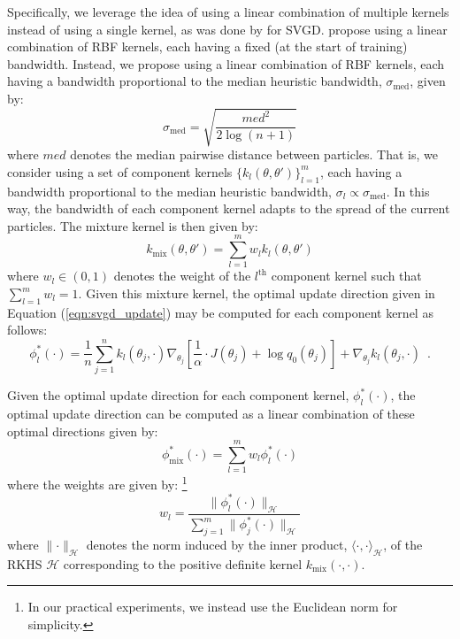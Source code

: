 Specifically, we leverage the idea of using a linear combination of multiple kernels  instead of using a single kernel, as was done by \citet{ai_mk_svgd} for SVGD. \citet{ai_mk_svgd} propose using a linear combination of RBF kernels, each having a fixed (at the start of training) bandwidth. Instead, we propose using a linear combination of RBF kernels, each having a bandwidth proportional to the median heuristic bandwidth, $\sigma_{\mathrm{med}}$, given by:
\renewcommand{\theequation}{4.10}
\begin{equation} 
\label{eqn:median_heuristic}
\sigma_{\mathrm{med}} = \sqrt{\frac{med^2}{2 \log(n+1)}}
\end{equation}
where $med$ denotes the median pairwise distance between particles. That is, we consider using a set of component kernels $\{k_l(\theta, \theta')\}_{l=1}^m$, each having a bandwidth proportional to the median heuristic bandwidth, $\sigma_l \propto \sigma_{\mathrm{med}}$. In this way, the bandwidth of each component kernel adapts to the spread of the current particles. The mixture kernel is then given by:
\renewcommand{\theequation}{4.11}
\begin{equation}
k_{\mathrm{mix}}(\theta, \theta') = \sum_{l=1}^m w_l k_l(\theta, \theta')
\end{equation}
where $w_l \in (0, 1)$ denotes the weight of the $l^\text{th}$ component kernel such that $\sum_{l=1}^m w_l = 1$. 
Given this mixture kernel, the optimal update direction given in Equation (\ref{eqn:svgd_update}) may be computed for each component kernel as follows:
\renewcommand{\theequation}{4.12}
\begin{equation}
\label{eqn:4_12}
\phi_l^*(\cdot) = \frac{1}{n}\sum_{j=1}^n k_l(\theta_j, \cdot) \nabla_{\theta_j}\left[\frac{1}{\alpha} \cdot J(\theta_j) + \log q_0(\theta_j) \right] + \nabla_{\theta_j}k_l(\theta_j, \cdot) \enspace.
\end{equation}

Given the optimal update direction for each component kernel, $\phi^*_l(\cdot)$, the optimal update direction can be computed as a linear combination of these optimal directions given by:
\renewcommand{\theequation}{4.13}
\begin{equation}
\label{eqn:4_13}
\phi_{\mathrm{mix}}^*(\cdot) = \sum_{l=1}^m w_l \phi^*_l(\cdot)
\end{equation}
where the weights are given by: \footnote{In our practical experiments, we instead use the Euclidean norm for simplicity.}
\renewcommand{\theequation}{4.14}
\begin{equation}
\label{eqn:4_14}
w_l= \frac{\lVert \phi_l^*(\cdot) \rVert_{\mathcal{H}}}{\sum_{j=1}^m \lVert \phi_j^*(\cdot) \rVert_{\mathcal{H}}}
\end{equation}
where $\lVert \cdot \rVert_{\mathcal{H}}$ denotes the norm induced by the inner product, $\langle \cdot, \cdot \rangle_{\mathcal{H}}$, of the RKHS $\mathcal{H}$ corresponding to the positive definite kernel $k_{\mathrm{mix}}(\cdot, \cdot)$.

